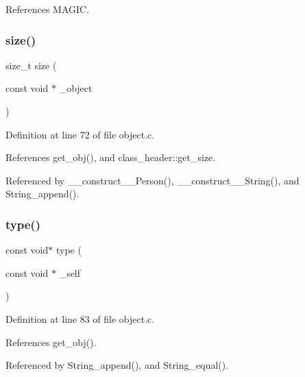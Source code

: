 References M\+A\+G\+IC.

\mbox{\label{group__low_gafac8564ed88a6f8585f043fc6b2fa7e1}} 
\subsubsection{\texorpdfstring{size()}{size()}}
{\footnotesize\ttfamily size\+\_\+t size (\begin{DoxyParamCaption}\item[{const void $\ast$}]{\+\_\+object }\end{DoxyParamCaption})}



Definition at line 72 of file object.\+c.



References get\+\_\+obj(), and class\+\_\+header\+::get\+\_\+size.



Referenced by \+\_\+\+\_\+construct\+\_\+\+\_\+\+Person(), \+\_\+\+\_\+construct\+\_\+\+\_\+\+String(), and String\+\_\+append().

\mbox{\label{group__low_ga504cef7fd39aff50e8e27f4f74568753}} 
\subsubsection{\texorpdfstring{type()}{type()}}
{\footnotesize\ttfamily const void$\ast$ type (\begin{DoxyParamCaption}\item[{const void $\ast$}]{\+\_\+self }\end{DoxyParamCaption})}



Definition at line 83 of file object.\+c.



References get\+\_\+obj().



Referenced by String\+\_\+append(), and String\+\_\+equal().

